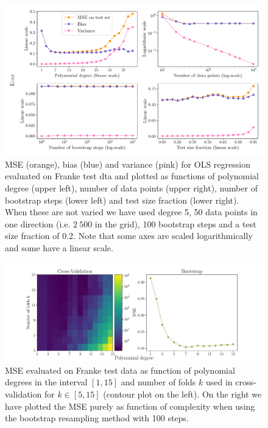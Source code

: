 \documentclass[aps,pra,english,notitlepage,reprint,nofootinbib]{revtex4-1}  %
\begin{document}
\begin{figure}
  \vspace*{-5pt}
  \centering %
  \includegraphics[width=\textwidth]{../figs/e_bias_variance.pdf}
  \caption{MSE (orange), bias (blue) and variance (pink) for OLS regression evaluated on Franke test dta and plotted as functions of polynomial degree (upper left), number of data points (upper right), number of bootstrap steps (lower left) and test size fraction (lower right). When these are not varied we have used degree 5, 50 data points in one direction (i.e. $2\:500$ in the grid), 100 bootstrap steps and a test size fraction of 0.2. Note that some axes are scaled logarithmically and some have a linear scale.}\label{fig:e bias variance}
  \vspace*{-5pt}
\end{figure}

\begin{figure}
  \vspace*{-5pt}
  \centering %
  \includegraphics[width=\textwidth]{../figs/f_kfold_vs_bootstrap.pdf}
  \caption{MSE evaluated on Franke test data as function of polynomial degrees in the interval $[1, 15]$ and number of folds $k$ used in cross-validation for $k\in[5, 15]$ (contour plot on the left). On the right we have plotted the MSE purely as function of complexity when using the bootstrap resampling method with 100 steps.}\label{fig:f kfold vs bootstrap}
  \vspace*{-5pt}
\end{figure}
\end{document}
